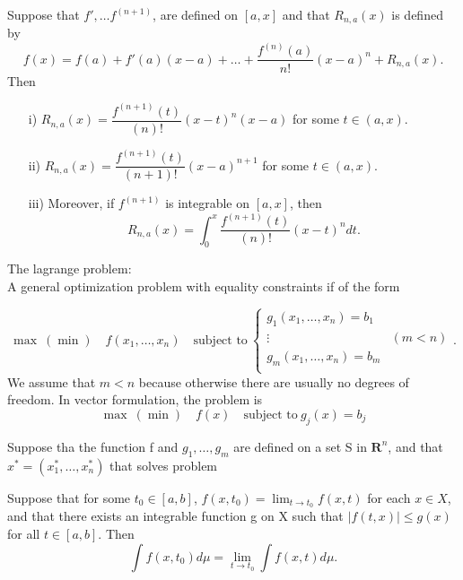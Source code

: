\begin{theorem}
    Suppose that $f', \ldots f^{(n+1)}$, are defined on $[a,x]$ and 
    that $R_{n,a}(x)$ is defined by
    $$
        f(x) = f(a) + f'(a)(x-a) + \dots +
        \frac{f^{(n)}(a)}{n!}(x-a)^{n} + R_{n,a}(x). 
    $$
    Then
    \begin{enumerate}
        \item[i)]
            $R_{n,a}(x) = \dfrac{f^{(n+1)}(t)}{(n)!}(x-t)^{n}(x-a)$ for some 
            $t \in (a,x)$.
        \item[ii)]
            $R_{n,a}(x) = \dfrac{f^{(n+1)}(t)}{(n+1)!}(x-a)^{n+1}$ for some 
            $t \in (a,x)$.
        \item[iii)]
            Moreover, if $f^{(n+1)}$ is integrable on $[a,x]$, then
            $$
                R_{n,a}(x) = \int_{0}^{x}\dfrac{f^{(n+1)}(t)}{(n)!}(x-t)^{n} dt.
            $$
    \end{enumerate}
\end{theorem}
The lagrange problem: \\
A general optimization problem with equality constraints if of the form

\begin{equation}
    \max \ (\min) \quad f(x_1, \ldots, x_n) \quad \text{subject to} \ %
    \left\lbrace 
        \begin{matrix}
            g_1(x_1, \ldots, x_n) = b_1 & \\
            \vdots & (m < n) \\
            g_m(x_1, \ldots, x_n) = b_m & \\
        \end{matrix}
    \right..
\end{equation}
We assume that $m<n$ because otherwise there are usually no degrees of freedom. 
In vector formulation, the problem is
$$
    \max \ (\min) \quad f(x) \quad \text{subject to} \ g_j(x) = b_j 
$$


\begin{theorem}
    Suppose tha the function f and $g_1, \ldots, g_m$ are defined on a set S in 
    $\mathbf{R}^n$, and that $x^* = (x_{1}^{*}, \ldots, x_{n}^{*})$ that solves 
    problem
\end{theorem}
\begin{corollary}
    Suppose that for some $t_0 \in [a,b]$, $f(x,t_0) = \lim_{t \to t_0} f(x,t)$
    for each $x \in X$, and that there exists an integrable function g on X 
    such that $|f(t,x)| \leq g(x)$ for all $t\in[a,b]$. Then 
    $$
        \int{f(x,t_0)}d\mu = \lim_{t \to t_0} \int{f(x,t)}d\mu. 
    $$
\end{corollary}

